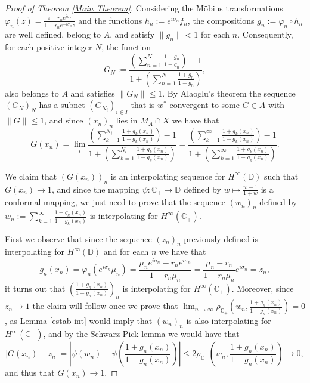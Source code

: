 \documentclass[preprint,12pt,number]{elsarticle}
\newcommand{\C}{\mathbb{C}}
\newcommand{\D}{\mathbb{D}}
\begin{document}
\begin{proof}[Proof of Theorem \ref{Main Theorem}]
    Considering the Möbius transformations $\varphi_n(z)=\frac{z-r_ne^{i\sigma_n}}{1-r_ne^{-i\sigma_n}z}$ and the functions $h_n:=e^{i\sigma_n}f_n$, the compositions $g_n:=\varphi_n\circ h_n$ are well defined, belong to $A$, and satisfy $\lVert g_n\rVert < 1$ for each $n$. Consequently, for each positive integer $N$, the function 
    \[
    G_N:=\frac{\left(\sum_{n=1}^N\frac{1+g_n}{1-g_n}\right)-1}{1+\left(\sum_{n=1}^N\frac{1+g_n}{1-g_n}\right)},
    \] 
    also belongs to $A$ and satisfies $\lVert G_N\rVert \leq 1$. By Alaoglu's theorem the sequence $(G_N)_N$ has a subnet $(G_{N_i})_{i\in I}$ that is $w^*$-convergent to some $G\in A$ with $\lVert G \rVert\leq 1$, and since $(x_n)_n$ lies in $M_A\cap X$ we have that 
    \[
    G(x_n)=\lim_i \frac{\left(\sum_{k=1}^{N_i}\frac{1+g_k(x_n)}{1-g_k(x_n)}\right)-1}{1+\left(\sum_{k=1}^{N_i}\frac{1+g_k(x_n)}{1-g_k(x_n)}\right)}=\frac{\left(\sum_{k=1}^\infty\frac{1+g_k(x_n)}{1-g_k(x_n)}\right)-1}{1+\left(\sum_{k=1}^\infty\frac{1+g_k(x_n)}{1-g_k(x_n)}\right)}.
    \]
   
   We claim that $(G(x_n))_n$ is an interpolating sequence for $H^\infty(\D)$ such that $G(x_n)\rightarrow1$, and since the mapping $\psi:\C_+\rightarrow\D$ defined by $w\mapsto\frac{w-1}{1+w}$ is a conformal mapping, we just need to prove that the sequence $(w_n)_n$ defined by $w_n:=\sum_{k=1}^\infty\frac{1+g_k(x_n)}{1-g_k(x_n)}$ is interpolating for $H^\infty(\C_+)$. 
   
   First we observe that since the sequence $(z_n)_n$ previously defined is interpolating for $H^\infty(\D)$ and for each $n$ we have that 
   \[
   g_n(x_n)=\varphi_n(e^{i\sigma_n}\mu_n)=\frac{\mu_ne^{i\sigma_n}-r_ne^{i\sigma_n}}{1-r_n\mu_n}=\frac{\mu_n-r_n}{1-r_n\mu_n}e^{i\sigma_n}=z_n,
   \] 
   it turns out that $\left(\frac{1+g_n(x_n)}{1-g_n(x_n)}\right)_n$ is interpolating for $H^\infty(\C_+)$. Moreover, since $z_n\rightarrow1$ the claim will follow once we prove that $\lim_{n\rightarrow\infty}\rho_{\C_+}\left(w_n,\frac{1+g_n(x_n)}{1-g_n(x_n)}\right)=0$, as Lemma \ref{estab-int} would imply that $(w_n)_n$ is also interpolating for $H^\infty(\C_+)$, and by the Schwarz-Pick lemma we would have that 
   \[
   |G(x_n)- z_n|=\left|\psi(w_n)-\psi\left(\frac{1+g_n(x_n)}{1-g_n(x_n)}\right)\right|\leq 2\rho_{\C_+}\left(w_n,\frac{1+g_n(x_n)}{1-g_n(x_n)}\right)\rightarrow0,
   \] 
   and thus that $G(x_n)\rightarrow1$. 
   

\end{proof}
\end{document}
